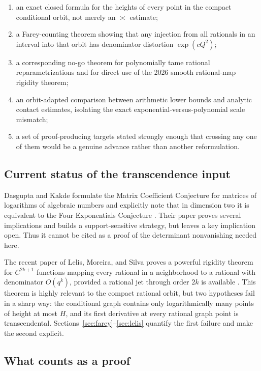 \documentclass[11pt]{article}
\theoremstyle{definition}
\theoremstyle{remark}
\begin{document}
\begin{enumerate}[leftmargin=2.2em]
\item an exact closed formula for the heights of every point in the compact conditional
      orbit, not merely an $\asymp$ estimate;
\item a Farey-counting theorem showing that any injection from all rationals in an interval
      into that orbit has denominator distortion $\exp(cQ^2)$;
\item a corresponding no-go theorem for polynomially tame rational reparametrizations and
      for direct use of the 2026 smooth rational-map rigidity theorem;
\item an orbit-adapted comparison between arithmetic lower bounds and analytic contact
      estimates, isolating the exact exponential-versus-polynomial scale mismatch;
\item a set of proof-producing targets stated strongly enough that crossing any one of them
      would be a genuine advance rather than another reformulation.
\end{enumerate}

\subsection{Current status of the transcendence input}

Dasgupta and Kakde formulate the Matrix Coefficient Conjecture for matrices of logarithms of
algebraic numbers and explicitly note that in dimension two it is equivalent to the Four
Exponentials Conjecture \cite{DasguptaKakde2024}.  Their paper proves several implications and
builds a support-sensitive strategy, but leaves a key implication open.  Thus it cannot be
cited as a proof of the determinant nonvanishing needed here.

The recent paper of Lelis, Moreira, and Silva proves a powerful rigidity theorem for
$C^{2k+1}$ functions mapping every rational in a neighborhood to a rational with denominator
$O(q^k)$, provided a rational jet through order $2k$ is available
\cite{LelisMoreiraSilva2026}.  This theorem is highly relevant to the compact rational orbit,
but two hypotheses fail in a sharp way: the conditional graph contains only logarithmically
many points of height at most $H$, and its first derivative at every rational graph point is
transcendental.  Sections~\ref{sec:farey}--\ref{sec:lelis} quantify the first failure and make
the second explicit.

\subsection{What counts as a proof}
\end{document}
